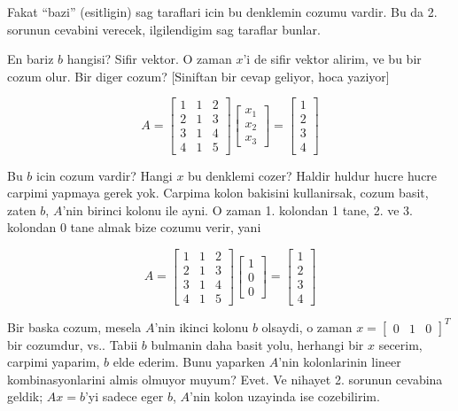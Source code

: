 \documentclass[12pt,fleqn]{article}\usepackage{../common}
\begin{document}
Fakat ``bazi'' (esitligin) sag taraflari icin bu denklemin cozumu
vardir. Bu da 2. sorunun cevabini verecek, ilgilendigim sag taraflar
bunlar. 

En bariz $b$ hangisi? Sifir vektor. O zaman $x$'i de sifir vektor alirim,
ve bu bir cozum olur. Bir diger cozum? [Siniftan bir cevap geliyor, hoca
yaziyor]


$$ A = 
\left[\begin{array}{rrr}
1 & 1 & 2 \\
2 & 1 & 3 \\
3 & 1 & 4 \\
4 & 1 & 5 
\end{array}\right]
\left[\begin{array}{r}
x_1  \\
x_2  \\
x_3  
\end{array}\right] 
=
\left[\begin{array}{r}
1  \\
2  \\
3  \\
4  
\end{array}\right]
 $$

Bu $b$ icin cozum vardir? Hangi $x$ bu denklemi cozer? Haldir huldur hucre
hucre carpimi yapmaya gerek yok. Carpima kolon bakisini kullanirsak, cozum
basit, zaten $b$, $A$'nin birinci kolonu ile ayni. O zaman 1. kolondan 1
tane, 2. ve 3. kolondan 0 tane almak bize cozumu verir, yani


$$ A = 
\left[\begin{array}{rrr}
1 & 1 & 2 \\
2 & 1 & 3 \\
3 & 1 & 4 \\
4 & 1 & 5 
\end{array}\right]
\left[\begin{array}{r}
1  \\
0  \\
0  
\end{array}\right] 
=
\left[\begin{array}{r}
1  \\
2  \\
3  \\
4  
\end{array}\right]
 $$


Bir baska cozum, mesela $A$'nin ikinci kolonu $b$ olsaydi, o zaman 
$x = \left[\begin{array}{rrr} 0 & 1 & 0 \end{array}\right]^T$ bir cozumdur,
vs.. Tabii $b$ bulmanin daha basit yolu, herhangi bir $x$ secerim, carpimi
yaparim, $b$ elde ederim. Bunu yaparken $A$'nin kolonlarinin lineer
kombinasyonlarini almis olmuyor muyum? Evet. Ve nihayet 2. sorunun cevabina 
geldik; $Ax=b$'yi sadece eger $b$, $A$'nin kolon uzayinda ise cozebilirim. 
\end{document}
